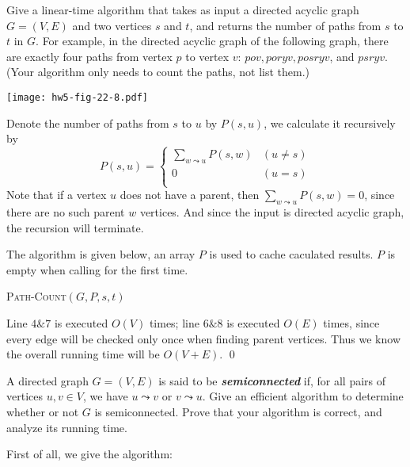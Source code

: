 Give a linear-time algorithm that takes as input a directed acyclic graph $G=(V, E)$ and two vertices $s$ and $t$, and returns the number of paths from $s$ to $t$ in $G$. For example,
in the directed acyclic graph of the following graph, there are exactly four paths from vertex $p$ to vertex $v$: $pov, poryv, posryv$, and $psryv$. (Your algorithm only needs to count the
paths, not list them.)
\begin{center}
\texttt{[image: hw5-fig-22-8.pdf]}
\end{center}
\answer
Denote the number of paths from $s$ to $u$ by $P(s, u)$, we calculate it recursively by
\begin{equation*}
P(s, u)=\left\{\begin{array}{ll}
\sum_{w \leadsto u}P(s, w)& (u \neq s)\\
0 & (u = s)\\
\end{array}\right.
\end{equation*}
Note that if a vertex $u$ does not have a parent, then $\sum_{w\leadsto u}P(s, w) = 0$, since there are no such parent $w$ vertices. And since the input is directed acyclic
graph, the recursion will terminate.

The algorithm is given below, an array $P$ is used to cache caculated results. $P$ is empty when calling for the first time.

\begin{algorithm}[H]
\caption{\textsc{Path-Count}$(G, P, s, t)$}
\end{algorithm}

Line $4 \& 7$ is executed $O(V)$ times; line $6\&8$ is executed $O(E)$ times, since every edge will be checked only once when finding parent vertices. Thus we know the overall running time will be $O(V + E)$.
\qed

A directed graph $G=(V, E)$ is said to be \textbf{\textsl{semiconnected}} if, for all pairs of vertices $u, v\in V$, we have $u\leadsto v$ or $v\leadsto u$. Give an efficient algorithm
to determine whether or not $G$ is semiconnected. Prove that your algorithm is correct, and analyze its running time.

\answer
First of all, we give the algorithm:

